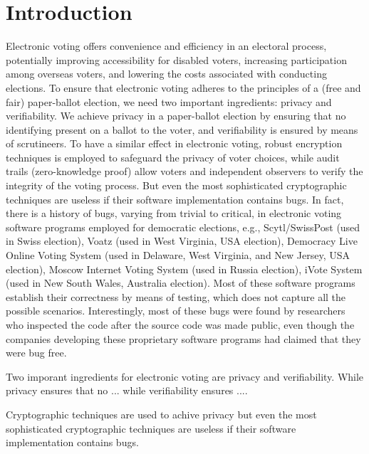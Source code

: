 \documentclass[sigconf]{acmart}
\begin{document}
\section{Introduction}


Electronic voting offers convenience and efficiency in an electoral process, 
potentially improving accessibility for disabled voters, increasing participation 
among overseas voters, and lowering the costs associated with conducting elections.
To ensure that electronic voting adheres to the principles of a (free and fair) 
paper-ballot election, we need two important ingredients: privacy and 
verifiability. We achieve privacy in a paper-ballot election by ensuring 
that no identifying present on a ballot to the voter, and verifiability 
is ensured by means of scrutineers. To have a similar effect in electronic 
voting, robust encryption techniques is employed to safeguard the privacy 
of voter choices, while audit trails (zero-knowledge proof)
allow voters and independent observers to verify the integrity 
of the voting process. But even the most 
sophisticated cryptographic techniques are useless if their software
implementation contains bugs. In fact, 
there is a history of bugs, varying from trivial to critical, 
in electronic voting software programs employed for democratic 
elections, e.g., Scytl/SwissPost \cite{9152765} (used in Swiss election), 
Voatz \cite{255334} (used in West Virginia, USA election),
Democracy Live Online Voting System \cite{263858} 
(used in Delaware, West Virginia, and New Jersey, USA election), 
Moscow Internet Voting System \cite{10.1007/978-3-030-51280-4_3}
(used in Russia election), iVote System \cite{10.1007/978-3-319-22270-7_3, 10.1145/3014812.3014837} 
(used in New South Wales, Australia election). 
Most of these software programs 
establish their correctness by means of testing, which 
does not capture all the possible scenarios. 
Interestingly, most of these bugs were found by researchers
who inspected the code after the source code was made public, 
even though the companies developing these proprietary software programs had 
claimed that they were bug free.


Two imporant ingredients for 
electronic voting are privacy and verifiability. While privacy 
ensures that no ... while verifiability ensures .... 

Cryptographic techniques are used to achive privacy 
but even the most 
sophisticated cryptographic techniques are useless if their software
implementation contains bugs.
\end{document}
